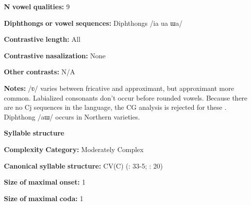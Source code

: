 \begin{styleBody}
\textbf{N} \textbf{vowel} \textbf{qualities:} 9
\end{styleBody}

\begin{styleBody}
\textbf{Diphthongs} \textbf{or} \textbf{vowel} \textbf{sequences:} Diphthongs /ia ua ɯa/
\end{styleBody}

\begin{styleBody}
\textbf{Contrastive} \textbf{length:} All
\end{styleBody}

\begin{styleBody}
\textbf{Contrastive} \textbf{nasalization:} None
\end{styleBody}

\begin{styleBody}
\textbf{Other} \textbf{contrasts:} N/A
\end{styleBody}

\begin{styleBody}
\textbf{Notes:} /ʋ/ varies between fricative and approximant, but approximant more common. Labialized consonants don’t occur before rounded vowels. Because there are no Cj sequences in the language, the CG analysis is rejected for these \citep[138]{Erickson2001}. Diphthong /aɯ/ occurs in Northern varieties.
\end{styleBody}

\begin{styleBody}
\textbf{Syllable} \textbf{structure}
\end{styleBody}

\begin{styleBody}
\textbf{Complexity} \textbf{Category:} Moderately Complex
\end{styleBody}

\begin{styleBody}
\textbf{Canonical} \textbf{syllable} \textbf{structure:} CV(C) (\citealt{Enfield2007}: 33-5; \citealt{MorevEtAl1979}: 20)
\end{styleBody}

\begin{styleBody}
\textbf{Size} \textbf{of} \textbf{maximal} \textbf{onset:} 1
\end{styleBody}

\begin{styleBody}
\textbf{Size} \textbf{of} \textbf{maximal} \textbf{coda:} 1
\end{styleBody}

